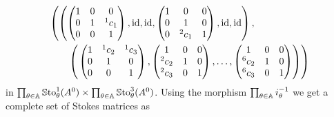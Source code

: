 \begin{align*}
  &\left(
  \left(
    \begin{pmatrix} 1 & 0 & 0 \\0 & 1 & {}^1c_1 \\0 & 0 & 1 \end{pmatrix},
    \operatorname{id},\operatorname{id},
    \begin{pmatrix} 1 & 0 & 0 \\0 & 1 & 0 \\0 & {}^2c_1 & 1 \end{pmatrix},
    \operatorname{id},\operatorname{id}
  \right),
  \right.
\\&\qquad\left(
  \left.
    \begin{pmatrix} 1 & {}^1c_2 & {}^1c_3 \\0 & 1 & 0 \\0 & 0 & 1 \end{pmatrix},
    \begin{pmatrix} 1 & 0 & 0 \\{}^2c_2 & 1 & 0 \\{}^2c_3 & 0 & 1 \end{pmatrix},
    \dots,
    \begin{pmatrix} 1 & 0 & 0 \\{}^{6}c_2 & 1 & 0 \\{}^{6}c_3 & 0 & 1 \end{pmatrix}
  \right)
  \right)
\end{align*}
in
$\prod_{\theta\in\mathbb{A}}\operatorname{\mathbb{S}to}_{\theta}^{1}(A^0) \times
\prod_{\theta\in\mathbb{A}}\operatorname{\mathbb{S}to}_{\theta}^{3}(A^0)$.
Using the morphism $\prod_{\theta\in\mathbb{A}}i_\theta^{-1}$ we get a complete set of
Stokes matrices as
